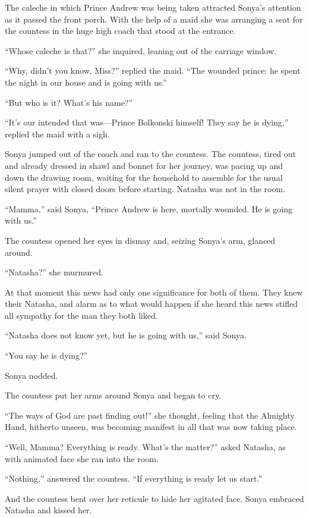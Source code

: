 The caleche in which Prince Andrew was being taken attracted
Sonya's attention as it passed the front porch. With the help of
a maid she was arranging a seat for the countess in the huge high
coach that stood at the entrance.

``Whose caleche is that?'' she inquired, leaning out of the
carriage window.

``Why, didn't you know, Miss?'' replied the maid. ``The wounded
prince: he spent the night in our house and is going with us.''

``But who is it? What's his name?''

``It's our intended that was---Prince Bolkonski himself! They say
he is dying,'' replied the maid with a sigh.

Sonya jumped out of the coach and ran to the countess. The
countess, tired out and already dressed in shawl and bonnet for
her journey, was pacing up and down the drawing room, waiting for
the household to assemble for the usual silent prayer with closed
doors before starting.  Natasha was not in the room.

``Mamma,'' said Sonya, ``Prince Andrew is here, mortally
wounded. He is going with us.''

The countess opened her eyes in dismay and, seizing Sonya's arm,
glanced around.

``Natasha?'' she murmured.

At that moment this news had only one significance for both of
them.  They knew their Natasha, and alarm as to what would happen
if she heard this news stifled all sympathy for the man they both
liked.

``Natasha does not know yet, but he is going with us,'' said
Sonya.

``You say he is dying?''

Sonya nodded.

The countess put her arms around Sonya and began to cry.

``The ways of God are past finding out!'' she thought, feeling
that the Almighty Hand, hitherto unseen, was becoming manifest in
all that was now taking place.

``Well, Mamma? Everything is ready. What's the matter?'' asked
Natasha, as with animated face she ran into the room.

``Nothing,'' answered the countess. ``If everything is ready let
us start.''

And the countess bent over her reticule to hide her agitated
face. Sonya embraced Natasha and kissed her.


